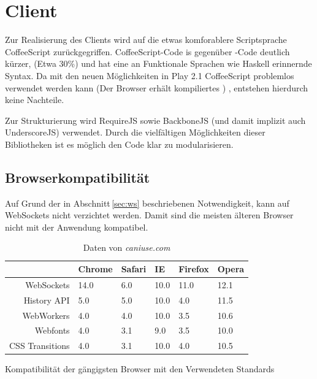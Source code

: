 \section{Client}

Zur Realisierung des Clients wird auf die etwas komforablere Scriptsprache CoffeeScript
zurückgegriffen. CoffeeScript-Code is gegenüber -Code deutlich kürzer, (Etwa 30\%) und hat
eine an Funktionale Sprachen wie Haskell erinnernde Syntax. Da mit den neuen Möglichkeiten in Play
2.1 CoffeeScript problemlos verwendet werden kann (Der Browser erhält kompiliertes ) ,
entstehen hierdurch keine Nachteile.

Zur Strukturierung wird RequireJS sowie BackboneJS (und damit implizit auch UnderscoreJS) verwendet.
Durch die vielfältigen Möglichkeiten dieser Bibliotheken ist es möglich den Code klar zu
modularisieren.

\subsection{Browserkompatibilität}
\label{sec:comp}

Auf Grund der in Abschnitt\,\ref{sec:ws} beschriebenen Notwendigkeit, kann auf WebSockets nicht
verzichtet werden. Damit sind die meisten älteren Browser nicht mit der Anwendung kompatibel.

\begin{table}[h]
\centering
\label{tab:comp}
\begin{tabular}{rlllll}
                  & \textbf{Chrome} & \textbf{Safari} & \textbf{IE} & \textbf{Firefox} 
                  & \textbf{Opera} \\\hline
  WebSockets      & 14.0            & 6.0             & 10.0        & 11.0             & 12.1  \\
  History API     & 5.0             & 5.0             & 10.0        & 4.0              & 11.5  \\
  WebWorkers      & 4.0             & 4.0             & 10.0        & 3.5              & 10.6  \\
  Webfonts        & 4.0             & 3.1             & 9.0         & 3.5              & 10.0  \\
  CSS Transitions & 4.0             & 3.1             & 10.0        & 4.0              & 10.5  \\  

\end{tabular}
\caption{Kompatibilität der gängigsten Browser mit den Verwendeten Standards}
  \caption*{Daten von \textit{caniuse.com}}
\end{table}

